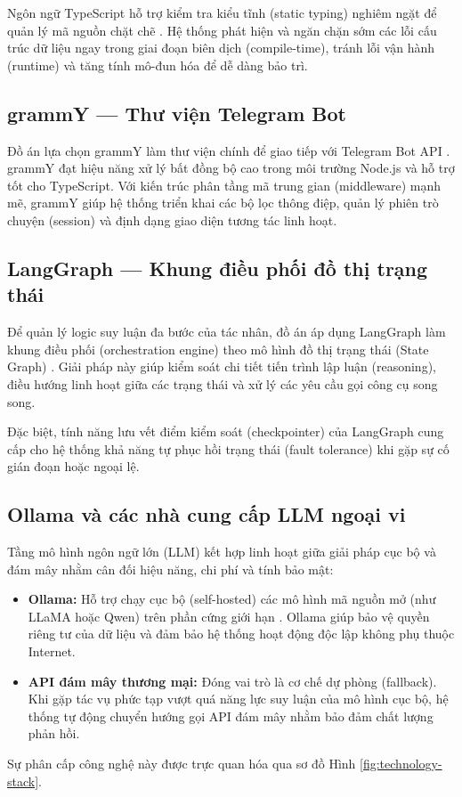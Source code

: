 Ngôn ngữ TypeScript hỗ trợ kiểm tra kiểu tĩnh (static typing) nghiêm ngặt để quản lý mã nguồn chặt chẽ \cite{typescriptDocs}. Hệ thống phát hiện và ngăn chặn sớm các lỗi cấu trúc dữ liệu ngay trong giai đoạn biên dịch (compile-time), tránh lỗi vận hành (runtime) và tăng tính mô-đun hóa để dễ dàng bảo trì.

\subsection{grammY — Thư viện Telegram Bot}
Đồ án lựa chọn grammY làm thư viện chính để giao tiếp với Telegram Bot API \cite{grammyDocs}. grammY đạt hiệu năng xử lý bất đồng bộ cao trong môi trường Node.js và hỗ trợ tốt cho TypeScript. Với kiến trúc phân tầng mã trung gian (middleware) mạnh mẽ, grammY giúp hệ thống triển khai các bộ lọc thông điệp, quản lý phiên trò chuyện (session) và định dạng giao diện tương tác linh hoạt.

\subsection{LangGraph — Khung điều phối đồ thị trạng thái}
Để quản lý logic suy luận đa bước của tác nhân, đồ án áp dụng LangGraph làm khung điều phối (orchestration engine) theo mô hình đồ thị trạng thái (State Graph) \cite{langgraphDocs}. Giải pháp này giúp kiểm soát chi tiết tiến trình lập luận (reasoning), điều hướng linh hoạt giữa các trạng thái và xử lý các yêu cầu gọi công cụ song song.

Đặc biệt, tính năng lưu vết điểm kiểm soát (checkpointer) của LangGraph cung cấp cho hệ thống khả năng tự phục hồi trạng thái (fault tolerance) khi gặp sự cố gián đoạn hoặc ngoại lệ.

\subsection{Ollama và các nhà cung cấp LLM ngoại vi}
Tầng mô hình ngôn ngữ lớn (LLM) kết hợp linh hoạt giữa giải pháp cục bộ và đám mây nhằm cân đối hiệu năng, chi phí và tính bảo mật:
\begin{itemize}
    \item \textbf{Ollama:} Hỗ trợ chạy cục bộ (self-hosted) các mô hình mã nguồn mở (như LLaMA hoặc Qwen) trên phần cứng giới hạn \cite{ollamaDocs}. Ollama giúp bảo vệ quyền riêng tư của dữ liệu và đảm bảo hệ thống hoạt động độc lập không phụ thuộc Internet.
    \item \textbf{API đám mây thương mại:} Đóng vai trò là cơ chế dự phòng (fallback). Khi gặp tác vụ phức tạp vượt quá năng lực suy luận của mô hình cục bộ, hệ thống tự động chuyển hướng gọi API đám mây nhằm bảo đảm chất lượng phản hồi.
\end{itemize}
Sự phân cấp công nghệ này được trực quan hóa qua sơ đồ Hình \ref{fig:technology-stack}.

